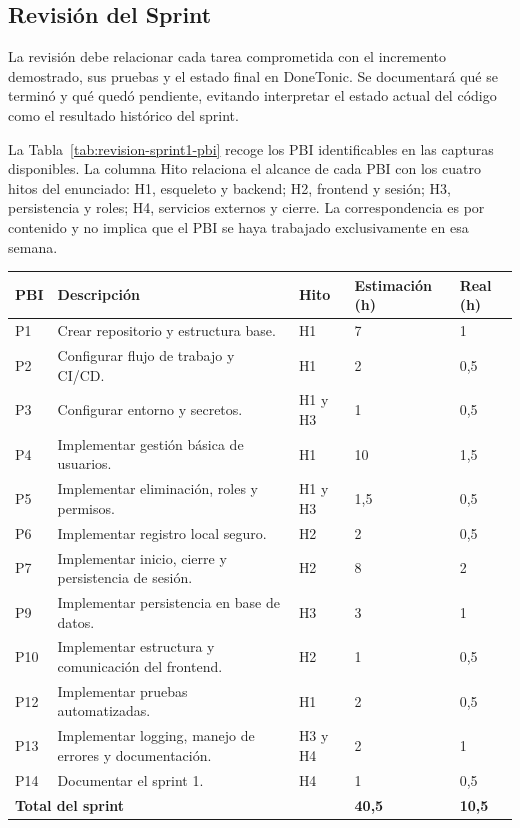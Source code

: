 \subsection{Revisión del Sprint}
La revisión debe relacionar cada tarea comprometida con el incremento demostrado, sus pruebas y el estado final en DoneTonic. Se documentará qué se terminó y qué quedó pendiente, evitando interpretar el estado actual del código como el resultado histórico del sprint.

La Tabla~\ref{tab:revision-sprint1-pbi} recoge los PBI identificables en las capturas disponibles. La columna Hito relaciona el alcance de cada PBI con los cuatro hitos del enunciado: H1, esqueleto y backend; H2, frontend y sesión; H3, persistencia y roles; H4, servicios externos y cierre. La correspondencia es por contenido y no implica que el PBI se haya trabajado exclusivamente en esa semana.

\begin{center}
\begin{minipage}{\textwidth}
\centering
\small
\renewcommand{\arraystretch}{1.25}
\begin{tabular}{|p{}|p{}|p{}|p{}|p{}|}
\hline
\textbf{PBI} & \textbf{Descripción} & \textbf{Hito} & \textbf{Estimación (h)} & \textbf{Real (h)} \\ \hline
P1 & Crear repositorio y estructura base. & H1 & 7 & 1 \\ \hline
P2 & Configurar flujo de trabajo y CI/CD. & H1 & 2 & 0,5 \\ \hline
P3 & Configurar entorno y secretos. & H1 y H3 & 1 & 0,5 \\ \hline
P4 & Implementar gestión básica de usuarios. & H1 & 10 & 1,5 \\ \hline
P5 & Implementar eliminación, roles y permisos. & H1 y H3 & 1,5 & 0,5 \\ \hline
P6 & Implementar registro local seguro. & H2 & 2 & 0,5 \\ \hline
P7 & Implementar inicio, cierre y persistencia de sesión. & H2 & 8 & 2 \\ \hline
P9 & Implementar persistencia en base de datos. & H3 & 3 & 1 \\ \hline
P10 & Implementar estructura y comunicación del frontend. & H2 & 1 & 0,5 \\ \hline
P12 & Implementar pruebas automatizadas. & H1 & 2 & 0,5 \\ \hline
P13 & Implementar logging, manejo de errores y documentación. & H3 y H4 & 2 & 1 \\ \hline
P14 & Documentar el sprint 1. & H4 & 1 & 0,5 \\ \hline
\multicolumn{3}{|l|}{\textbf{Total del sprint}} & \textbf{40,5} & \textbf{10,5} \\ \hline
\end{tabular}
\captionsetup{hypcap=false}
\label{tab:revision-sprint1-pbi}
\end{minipage}
\end{center}

